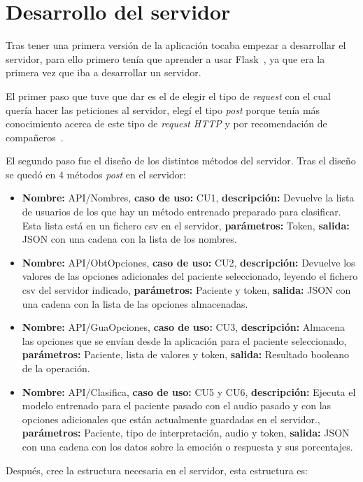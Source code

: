 \section{Desarrollo del servidor}
Tras tener una primera versión de la aplicación tocaba empezar a desarrollar el servidor, para ello primero tenía que aprender a usar Flask~\cite{flask}, ya que era la primera vez que iba a desarrollar un servidor.

El primer paso que tuve que dar es el de elegir el tipo de \textit{request} con el cual quería hacer las peticiones al servidor, elegí el tipo \textit{post} porque tenía más conocimiento acerca de este tipo de \textit{request HTTP} y por recomendación de compañeros~\cite{sdintro,sdhttp}.

El segundo paso fue el diseño de los distintos métodos del servidor. Tras el diseño se quedó en 4 métodos \textit{post} en el servidor:
\begin{itemize}
	\item \textbf{Nombre:} API/Nombres, \textbf{caso de uso:} CU1, \textbf{descripción:} Devuelve la lista de usuarios de los que hay un método entrenado preparado para clasificar. Esta lista está en un fichero csv en el servidor, \textbf{parámetros:} Token, \textbf{salida:} JSON con una cadena con la lista de los nombres.
	\item \textbf{Nombre:} API/ObtOpciones, \textbf{caso de uso:} CU2, \textbf{descripción:} Devuelve los valores de las opciones adicionales del paciente seleccionado, leyendo el fichero csv del servidor indicado, \textbf{parámetros:} Paciente y token, \textbf{salida:} JSON con una cadena con la lista de las opciones almacenadas.
	\item \textbf{Nombre:} API/GuaOpciones, \textbf{caso de uso:} CU3, \textbf{descripción:} Almacena las opciones que se envían desde la aplicación para el paciente seleccionado, \textbf{parámetros:} Paciente, lista de valores y token, \textbf{salida:} Resultado booleano de la operación.
	\item \textbf{Nombre:} API/Clasifica, \textbf{caso de uso:} CU5 y CU6, \textbf{descripción:} Ejecuta el modelo entrenado para el paciente pasado con el audio pasado y con las opciones adicionales que están actualmente guardadas en el servidor., \textbf{parámetros:} Paciente, tipo de interpretación, audio y token, \textbf{salida:} JSON con una cadena con los datos sobre la emoción o respuesta y sus porcentajes.
\end{itemize}

Después, cree la estructura necesaria en el servidor, esta estructura es:

